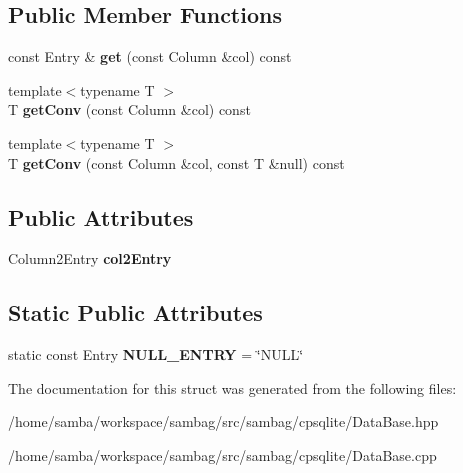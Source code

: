 \subsection*{Public Member Functions}
\begin{DoxyCompactItemize}
\item 
\hypertarget{structsambag_1_1cpsqlite_1_1_data_base_1_1_result_a42eaa8175a01058489f935cadadb2f72}{
const Entry \& {\bfseries get} (const Column \&col) const }
\label{structsambag_1_1cpsqlite_1_1_data_base_1_1_result_a42eaa8175a01058489f935cadadb2f72}

\item 
\hypertarget{structsambag_1_1cpsqlite_1_1_data_base_1_1_result_a4d2c9e0223d602820631b6a3d5170b58}{
{\footnotesize template$<$typename T $>$ }\\T {\bfseries getConv} (const Column \&col) const }
\label{structsambag_1_1cpsqlite_1_1_data_base_1_1_result_a4d2c9e0223d602820631b6a3d5170b58}

\item 
\hypertarget{structsambag_1_1cpsqlite_1_1_data_base_1_1_result_abed1428aefd0e911d4c051002b414363}{
{\footnotesize template$<$typename T $>$ }\\T {\bfseries getConv} (const Column \&col, const T \&null) const }
\label{structsambag_1_1cpsqlite_1_1_data_base_1_1_result_abed1428aefd0e911d4c051002b414363}

\end{DoxyCompactItemize}
\subsection*{Public Attributes}
\begin{DoxyCompactItemize}
\item 
\hypertarget{structsambag_1_1cpsqlite_1_1_data_base_1_1_result_a24038560f824afe4fdb404935682b393}{
Column2Entry {\bfseries col2Entry}}
\label{structsambag_1_1cpsqlite_1_1_data_base_1_1_result_a24038560f824afe4fdb404935682b393}

\end{DoxyCompactItemize}
\subsection*{Static Public Attributes}
\begin{DoxyCompactItemize}
\item 
\hypertarget{structsambag_1_1cpsqlite_1_1_data_base_1_1_result_a8c055272d29a6b3d290d59163e50f798}{
static const Entry {\bfseries NULL\_\-ENTRY} = \char`\"{}NULL\char`\"{}}
\label{structsambag_1_1cpsqlite_1_1_data_base_1_1_result_a8c055272d29a6b3d290d59163e50f798}

\end{DoxyCompactItemize}


The documentation for this struct was generated from the following files:\begin{DoxyCompactItemize}
\item 
/home/samba/workspace/sambag/src/sambag/cpsqlite/DataBase.hpp\item 
/home/samba/workspace/sambag/src/sambag/cpsqlite/DataBase.cpp\end{DoxyCompactItemize}

